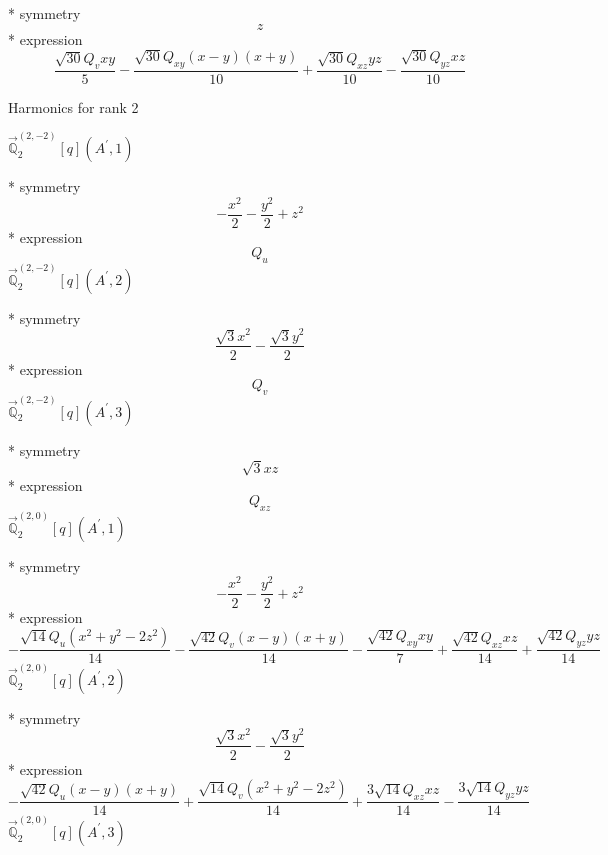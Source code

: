 \documentclass[fleqn,8pt]{jsarticle}
\begin{document}
\noindent\quad ** symmetry
\begin{dmath*}
z
\end{dmath*}
\noindent\quad ** expression
\begin{dmath*}
\frac{\sqrt{30} Q_{v} x y}{5} - \frac{\sqrt{30} Q_{xy} \left(x - y\right) \left(x + y\right)}{10} + \frac{\sqrt{30} Q_{xz} y z}{10} - \frac{\sqrt{30} Q_{yz} x z}{10}
\end{dmath*}

\noindent * Harmonics for rank 2

\noindent\quad $\vec{\mathbb{Q}}_{2}^{(2,-2)}[q](A^{\prime},1)$

\noindent\quad ** symmetry
\begin{dmath*}
- \frac{x^{2}}{2} - \frac{y^{2}}{2} + z^{2}
\end{dmath*}
\noindent\quad ** expression
\begin{dmath*}
Q_{u}
\end{dmath*}
\noindent\quad $\vec{\mathbb{Q}}_{2}^{(2,-2)}[q](A^{\prime},2)$

\noindent\quad ** symmetry
\begin{dmath*}
\frac{\sqrt{3} x^{2}}{2} - \frac{\sqrt{3} y^{2}}{2}
\end{dmath*}
\noindent\quad ** expression
\begin{dmath*}
Q_{v}
\end{dmath*}
\noindent\quad $\vec{\mathbb{Q}}_{2}^{(2,-2)}[q](A^{\prime},3)$

\noindent\quad ** symmetry
\begin{dmath*}
\sqrt{3} x z
\end{dmath*}
\noindent\quad ** expression
\begin{dmath*}
Q_{xz}
\end{dmath*}
\noindent\quad $\vec{\mathbb{Q}}_{2}^{(2,0)}[q](A^{\prime},1)$

\noindent\quad ** symmetry
\begin{dmath*}
- \frac{x^{2}}{2} - \frac{y^{2}}{2} + z^{2}
\end{dmath*}
\noindent\quad ** expression
\begin{dmath*}
- \frac{\sqrt{14} Q_{u} \left(x^{2} + y^{2} - 2 z^{2}\right)}{14} - \frac{\sqrt{42} Q_{v} \left(x - y\right) \left(x + y\right)}{14} - \frac{\sqrt{42} Q_{xy} x y}{7} + \frac{\sqrt{42} Q_{xz} x z}{14} + \frac{\sqrt{42} Q_{yz} y z}{14}
\end{dmath*}
\noindent\quad $\vec{\mathbb{Q}}_{2}^{(2,0)}[q](A^{\prime},2)$

\noindent\quad ** symmetry
\begin{dmath*}
\frac{\sqrt{3} x^{2}}{2} - \frac{\sqrt{3} y^{2}}{2}
\end{dmath*}
\noindent\quad ** expression
\begin{dmath*}
- \frac{\sqrt{42} Q_{u} \left(x - y\right) \left(x + y\right)}{14} + \frac{\sqrt{14} Q_{v} \left(x^{2} + y^{2} - 2 z^{2}\right)}{14} + \frac{3 \sqrt{14} Q_{xz} x z}{14} - \frac{3 \sqrt{14} Q_{yz} y z}{14}
\end{dmath*}
\noindent\quad $\vec{\mathbb{Q}}_{2}^{(2,0)}[q](A^{\prime},3)$
\end{document}
